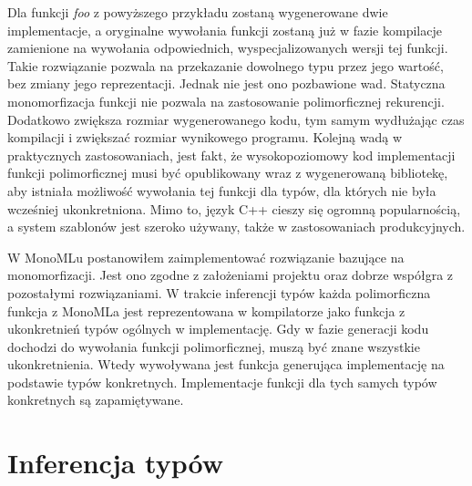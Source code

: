 \documentclass[declaration,shortabstract]{iithesis}
\begin{document}
Dla funkcji \textit{foo} z powyższego przykładu zostaną wygenerowane dwie 
implementacje, a oryginalne wywołania funkcji zostaną już w fazie kompilacje
zamienione na wywołania odpowiednich, wyspecjalizowanych wersji tej funkcji.
Takie rozwiązanie pozwala na przekazanie dowolnego typu przez jego wartość, 
bez zmiany jego reprezentacji. Jednak nie jest ono pozbawione wad. 
Statyczna monomorfizacja funkcji nie pozwala na zastosowanie polimorficznej
rekurencji. Dodatkowo zwiększa rozmiar wygenerowanego kodu, tym samym 
wydłużając czas kompilacji i zwiększać rozmiar wynikowego programu. Kolejną 
wadą w praktycznych zastosowaniach, jest fakt, że wysokopoziomowy kod 
implementacji funkcji polimorficznej musi być opublikowany wraz z wygenerowaną 
bibliotekę, aby istniała możliwość wywołania tej funkcji dla typów, dla 
których nie była wcześniej ukonkretniona. Mimo to, język C++ cieszy 
się ogromną popularnością, a system szablonów jest szeroko używany, także w 
zastosowaniach produkcyjnych. 

W MonoMLu postanowiłem zaimplementować rozwiązanie bazujące na 
monomorfizacji. Jest ono zgodne z założeniami projektu oraz dobrze współgra z 
pozostałymi rozwiązaniami. W trakcie inferencji typów każda polimorficzna 
funkcja z MonoMLa jest reprezentowana w kompilatorze jako funkcja z 
ukonkretnień typów ogólnych w implementację. Gdy w fazie generacji kodu 
dochodzi do wywołania funkcji polimorficznej, muszą być znane wszystkie 
ukonkretnienia. Wtedy wywoływana jest funkcja generująca implementację na 
podstawie typów konkretnych. Implementacje funkcji dla tych samych typów 
konkretnych są zapamiętywane.



\section{Inferencja typów}
\end{document}

